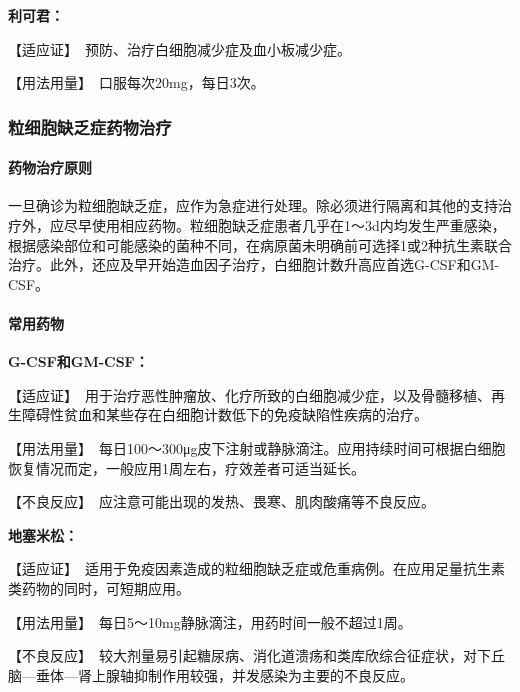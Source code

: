\textbf{利可君：}

【适应证】　预防、治疗白细胞减少症及血小板减少症。

【用法用量】　口服每次20mg，每日3次。

\subsubsection{粒细胞缺乏症药物治疗}
\paragraph{药物治疗原则}

一旦确诊为粒细胞缺乏症，应作为急症进行处理。除必须进行隔离和其他的支持治疗外，应尽早使用相应药物。粒细胞缺乏症患者几乎在1～3d内均发生严重感染，根据感染部位和可能感染的菌种不同，在病原菌未明确前可选择1或2种抗生素联合治疗。此外，还应及早开始造血因子治疗，白细胞计数升高应首选G-CSF和GM-CSF。
\paragraph{常用药物}

\textbf{G-CSF和GM-CSF：}

【适应证】　用于治疗恶性肿瘤放、化疗所致的白细胞减少症，以及骨髓移植、再生障碍性贫血和某些存在白细胞计数低下的免疫缺陷性疾病的治疗。

【用法用量】　每日100～300μg皮下注射或静脉滴注。应用持续时间可根据白细胞恢复情况而定，一般应用1周左右，疗效差者可适当延长。

【不良反应】　应注意可能出现的发热、畏寒、肌肉酸痛等不良反应。

\textbf{地塞米松：}

【适应证】　适用于免疫因素造成的粒细胞缺乏症或危重病例。在应用足量抗生素类药物的同时，可短期应用。

【用法用量】　每日5～10mg静脉滴注，用药时间一般不超过1周。

【不良反应】　较大剂量易引起糖尿病、消化道溃疡和类库欣综合征症状，对下丘脑---垂体---肾上腺轴抑制作用较强，并发感染为主要的不良反应。